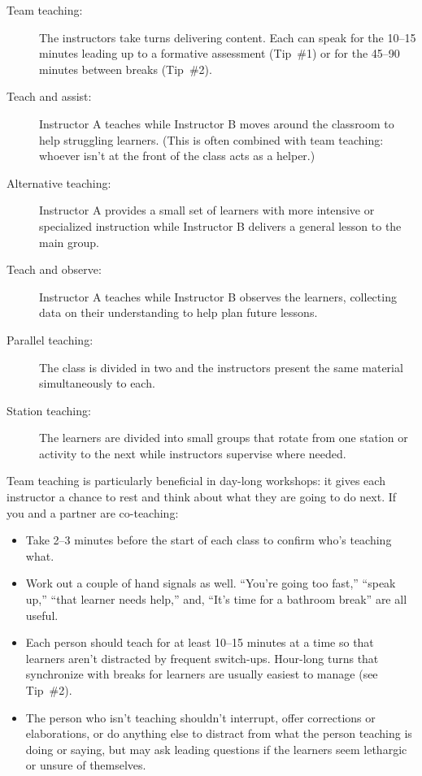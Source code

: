 \documentclass[10pt,letterpaper]{article}
\begin{document}
\begin{description}

\item[Team teaching:]
  The instructors take turns delivering content.
  Each can speak for the 10--15 minutes leading up to a formative assessment (Tip~\#1)
  or for the 45--90 minutes between breaks (Tip~\#2).

\item[Teach and assist:]
  Instructor A teaches while Instructor B moves around the classroom
  to help struggling learners.
  (This is often combined with team teaching:
  whoever isn't at the front of the class acts as a helper.)

\item[Alternative teaching:]
  Instructor A provides a small set of learners with more intensive or specialized instruction
  while Instructor B delivers a general lesson to the main group.

\item[Teach and observe:]
  Instructor A teaches while Instructor B observes the learners,
  collecting data on their understanding to help plan future lessons.

\item[Parallel teaching:]
  The class is divided in two
  and the instructors present the same material simultaneously to each.

\item[Station teaching:]
  The learners are divided into small groups
  that rotate from one station or activity to the next
  while instructors supervise where needed.

\end{description}

Team teaching is particularly beneficial in day-long workshops:
it gives each instructor a chance to rest and think about what they are going to do next.
If you and a partner are co-teaching:

\begin{itemize}

\item
  Take 2--3 minutes before the start of each class
  to confirm who's teaching what.

\item
  Work out a couple of hand signals as well.
  ``You're going too fast,''
  ``speak up,''
  ``that learner needs help,''
  and, ``It's time for a bathroom break'' are all useful.

\item
  Each person should teach for at least 10--15 minutes at a time
  so that learners aren't distracted by frequent switch-ups.
  Hour-long turns that synchronize with breaks for learners
  are usually easiest to manage (see Tip~\#2).

\item
  The person who isn't teaching shouldn't interrupt,
  offer corrections or elaborations,
  or do anything else to distract from what the person teaching is doing or saying,
  but may ask leading questions
  if the learners seem lethargic or unsure of themselves.

\end{itemize}
\end{document}
